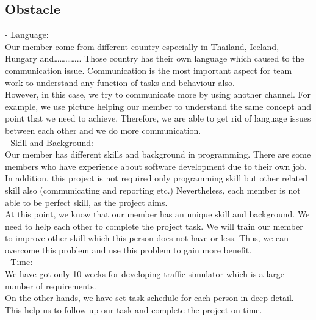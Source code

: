 \documentclass[11pt]{article}
\begin{document}
	\subsection{Obstacle}
		\indent\indent - Language: \\
		\indent\indent Our member come from different country especially in Thailand, Iceland, Hungary and………….. Those country has their own language which caused to the communication issue. Communication is the most important aspect for team work to understand any function of tasks and behaviour also. \\
		\indent\indent However, in this case, we try to communicate more by using another channel. For example, we use picture helping our member to understand the same concept and point that we need to achieve. Therefore, we are able to get rid of language issues between each other and we do more communication.  \\     
	\indent - Skill and Background:\\
		\indent\indent Our member has different skills and background in programming. There are some members who have experience about software development due to their own job. In addition, this project is not required only programming skill but other related skill also (communicating and reporting etc.) Nevertheless, each member is not able to be perfect skill, as the project aims. \\
		\indent\indent At this point, we know that our member has an unique skill and background. We need to help each other to complete the project task. We will train our member to improve other skill which this person does not have or less. Thus, we can overcome this problem and use this problem to gain more benefit. \\
	\indent - Time: \\
		\indent\indent We have got only 10 weeks for developing traffic simulator which is a large number of requirements. \\
		\indent\indent On the other hands, we have set task schedule for each person in deep detail. This help us to follow up our task and complete the project on time. 


	
\newpage
\end{document}

